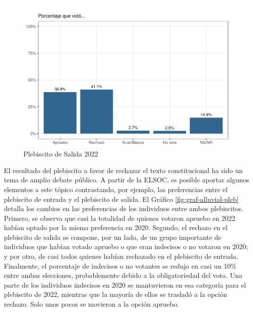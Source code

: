 \documentclass[
  12pt,
]{book}
\begin{document}
\begin{figure}

{\centering \includegraphics{reporte-elsoc_files/figure-latex/graf-pleb-salida-1} 

}

\caption{Plebiscito de Salida 2022}\label{fig:graf-pleb-salida}
\end{figure}

El resultado del plebiscito a favor de rechazar el texto constitucional ha sido un tema de amplio debate público. A partir de la ELSOC, es posible aportar algunos elementos a este tópico contrastando, por ejemplo, las preferencias entre el plebiscito de entrada y el plebiscito de salida. El Gráfico \ref{fig:graf-alluvial-pleb} detalla los cambios en las preferencias de los individuos entre ambos plebiscitos. Primero, se observa que casi la totalidad de quienes votaron apruebo en 2022 habían optado por la misma preferencia en 2020. Segundo, el rechazo en el plebiscito de salida se compone, por un lado, de un grupo importante de individuos que habían votado apruebo o que eran indecisos o no votaron en 2020; y por otro, de casi todos quienes habían rechazado en el plebiscito de entrada. Finalmente, el porcentaje de indecisos o no votantes se redujo en casi un 10\% entre ambas elecciones, probablemente debido a la obligatoriedad del voto. Una parte de los individuos indecisos en 2020 se mantuvieron en esa categoría para el plebiscito de 2022, mientras que la mayoría de ellos se trasladó a la opción rechazo. Solo unos pocos se movieron a la opción apruebo.
\end{document}

